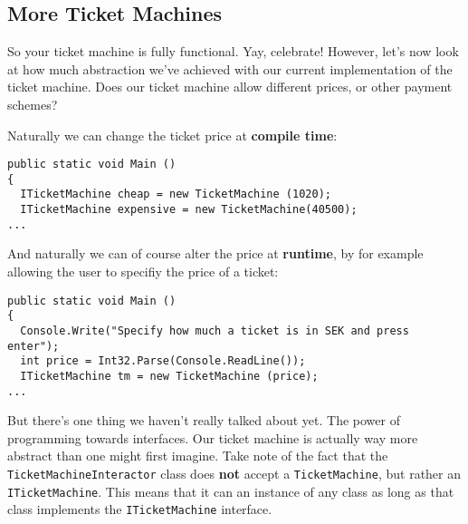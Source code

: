 \documentclass{article}
\begin{document}
\pagebreak
\subsection{More Ticket Machines}
So your ticket machine is fully functional. Yay, celebrate! However, let’s now look at how much abstraction we've achieved with our current implementation of the ticket machine. Does our ticket machine allow different prices, or other payment schemes?

Naturally we can change the ticket price at \textbf{compile time}:
\begin{lstlisting}
public static void Main ()
{ 
  ITicketMachine cheap = new TicketMachine (1020);
  ITicketMachine expensive = new TicketMachine(40500);
...
\end{lstlisting}
And naturally we can of course alter the price at \textbf{runtime}, by for example allowing the user to specifiy the price of a ticket:
\begin{lstlisting}
public static void Main ()
{ 
  Console.Write("Specify how much a ticket is in SEK and press enter");
  int price = Int32.Parse(Console.ReadLine());
  ITicketMachine tm = new TicketMachine (price);
...
\end{lstlisting}
But there's one thing we haven't really talked about yet. The power of programming towards interfaces. Our ticket machine is actually way more abstract than one might first imagine. Take note of the fact that the \texttt{TicketMachineInteractor} class does \textbf{not} accept a \texttt{TicketMachine}, but rather an \texttt{ITicketMachine}. This means that it can an instance of any class as long as that class implements the \texttt{ITicketMachine} interface.
\end{document}
